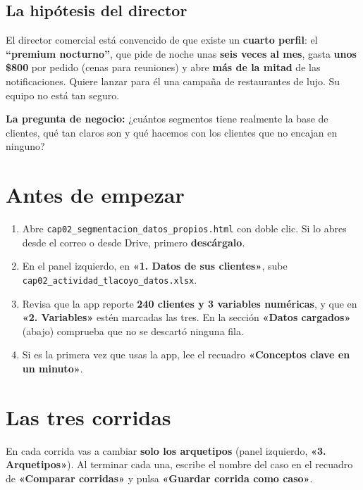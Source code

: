 \documentclass[11pt,letterpaper]{article}
\newcommand{\app}[1]{\textbf{\color{guindaOsc}«#1»}}
\newcommand{\col}[1]{\texttt{\footnotesize #1}}
\begin{document}
\subsection{La hip\'otesis del director}

El director comercial est\'a convencido de que existe un \textbf{cuarto perfil}: el \textbf{\enquote{premium nocturno}}, que pide de noche unas \textbf{seis veces al mes}, gasta \textbf{unos \$800} por pedido (cenas para reuniones) y abre \textbf{m\'as de la mitad} de las notificaciones. Quiere lanzar para \'el una campa\~na de restaurantes de lujo. Su equipo no est\'a tan seguro.

\begin{tcolorbox}[enhanced,colback=guindaClara,colframe=guinda,boxrule=0pt,arc=2pt,left=10pt,right=10pt,top=6pt,bottom=6pt]
\textbf{\color{guinda}La pregunta de negocio:} ¿cu\'antos segmentos tiene realmente la base de clientes, qu\'e tan claros son y qu\'e hacemos con los clientes que no encajan en ninguno?
\end{tcolorbox}

\section{Antes de empezar}
\begin{enumerate}[leftmargin=*]
\item Abre \col{cap02\_segmentacion\_datos\_propios.html} con doble clic. Si lo abres desde el correo o desde Drive, primero \textbf{desc\'argalo}.
\item En el panel izquierdo, en \app{1. Datos de sus clientes}, sube \col{cap02\_actividad\_tlacoyo\_datos.xlsx}.
\item Revisa que la app reporte \textbf{240 clientes y 3 variables num\'ericas}, y que en \app{2. Variables} est\'en marcadas las tres. En la secci\'on \app{Datos cargados} (abajo) comprueba que no se descart\'o ninguna fila.
\item Si es la primera vez que usas la app, lee el recuadro \app{Conceptos clave en un minuto}.
\end{enumerate}

\section{Las tres corridas}
En cada corrida vas a cambiar \textbf{solo los arquetipos} (panel izquierdo, \app{3. Arquetipos}). Al terminar cada una, escribe el nombre del caso en el recuadro de \app{Comparar corridas} y pulsa \app{Guardar corrida como caso}.
\end{document}
